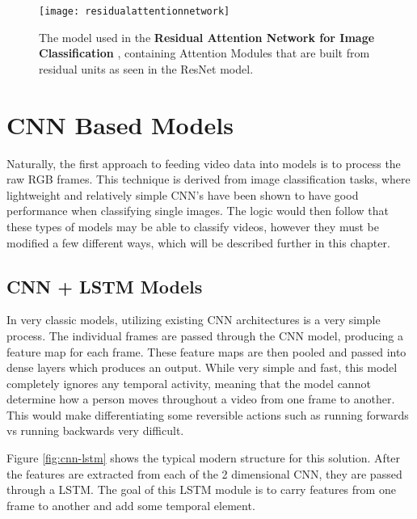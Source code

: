 \begin{figure}[ht]
	\texttt{[image: residualattentionnetwork]}
	\centering
	\caption{The model used in the \textbf{Residual Attention Network for Image Classification} \cite{residualattentionnetwork}, containing Attention Modules that are built from residual units as seen in the ResNet \cite{resnet} model.}
	\label{fig:residualattentionnetwork}
\end{figure}

\section{CNN Based Models}

Naturally, the first approach to feeding video data into models is to process the raw RGB frames. This technique is derived from image classification tasks, where lightweight and relatively simple CNN's have been shown to have good performance when classifying single images. The logic would then follow that these types of models may be able to classify videos, however they must be modified a few different ways, which will be described further in this chapter.

\subsection{CNN + LSTM Models}

In very classic models, utilizing existing CNN architectures is a very simple process. The individual frames are passed through the CNN model, producing a feature map for each frame. These feature maps are then pooled and passed into dense layers which produces an output. While very simple and fast, this model completely ignores any temporal activity, meaning that the model cannot determine how a person moves throughout a video from one frame to another. This would make differentiating some reversible actions such as running forwards vs running backwards very difficult.

Figure \ref{fig:cnn-lstm} shows the typical modern structure for this solution. After the features are extracted from each of the 2 dimensional CNN, they are passed through a LSTM. The goal of this LSTM module is to carry features from one frame to another and add some temporal element.


